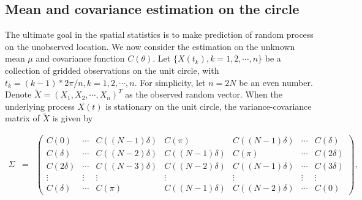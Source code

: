 \subsection{Mean and covariance estimation on the circle}

The ultimate goal in the spatial statistics is to make prediction of random process on the unobserved location. We now consider the estimation on the unknown mean $\mu$ and covariance function $C(\theta)$. Let $\{X(t_k), k = 1, 2, \cdots, n\}$ be a collection of gridded observations on the unit circle, with $t_k = (k-1)*2\pi/n, k = 1, 2, \cdots, n$. For simplicity, let $n = 2N$ be an even number. Denote $\utilde{X} = (X_1, X_2, \cdots, X_n)^T$ as the observed random vector. When the underlying process $X(t)$ is stationary on the unit circle, the variance-covariance matrix of $\utilde{X}$ is given by


\begin{eqnarray*}
	\Sigma &=& \left(\begin{array}{ccccccc}
	C(0)      & \cdots & C((N-1)\delta ) & C(\pi) &  C((N-1)\delta ) & \cdots & C(\delta) \\
	C(\delta) & \cdots & C((N-2)\delta) & C((N-1)\delta) &  C(\pi)  & \cdots & C(2\delta) \\
	C(2\delta) & \cdots & C((N-3)\delta) & C((N-2)\delta) &  C((N-1)\delta) & \cdots & C(3\delta)\\
	\vdots    & \vdots  & \vdots  & \vdots  & \vdots  & \vdots  & \vdots  \\
	C(\delta) & \cdots & C(\pi) &  C((N-1)\delta) & C((N-2)\delta)  & \cdots & C(0) 
	\end{array} \right),
\end{eqnarray*}


